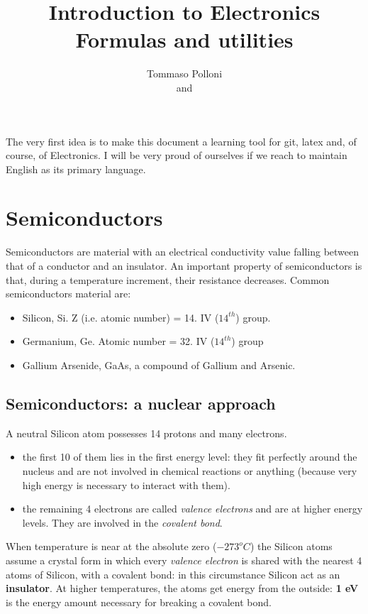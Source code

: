 \documentclass[12pt]{article}
\begin{document}
 
 
 
\title{Introduction to Electronics\\
Formulas and utilities}
\author{Tommaso Polloni\\
and }
 
 The very first idea is to make this document a learning tool for git, latex and, of course, of Electronics. I will be very proud of ourselves if we reach to maintain English as its primary language.
\maketitle
\tableofcontents

\section{Semiconductors} 
Semiconductors are material with an electrical conductivity value falling between that of a conductor and an insulator.
An important property of semiconductors is that, during a temperature increment, their resistance decreases.
Common semiconductors material are:
\begin{itemize}
	\item {}Silicon, Si. Z (i.e. atomic number) = 14. IV ($14^{th}$) group.
	\item Germanium, Ge. Atomic number = 32. IV ($14^{th}$) group
	\item Gallium Arsenide, GaAs, a compound of Gallium and Arsenic.
\end{itemize}

\subsection{Semiconductors: a nuclear approach}
A neutral Silicon atom possesses 14 protons and many electrons.
\begin{itemize}
	\item the first 10 of them lies in the first energy level: they fit perfectly around the nucleus and  are not involved in chemical reactions or anything (because very high energy is necessary to interact with them).
	\item the remaining 4 electrons are called \textit{valence electrons} and are at higher energy levels. They are involved in the \textit{covalent bond}.
\end{itemize}
When temperature is near at the absolute zero ($-273^o C$) the Silicon atoms assume a crystal form in which every \textit{valence electron} is shared with the nearest 4 atoms of Silicon, with a covalent bond: in this circumstance Silicon act as an \textbf{insulator}.
At higher temperatures, the atoms get energy from the outside: \textbf{1 eV} is the energy amount necessary for breaking a covalent bond. 
\end{document}
